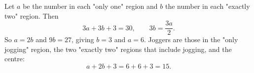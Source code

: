 Let $a$ be the number in each "only one" region and $b$ the number in each "exactly two" region. Then
\[
3a+3b+3=30,\qquad 3b=\dfrac{3a}{2}.
\]
So $a=2b$ and $9b=27$, giving $b=3$ and $a=6$. Joggers are those in the "only jogging" region, the two "exactly two" regions that include jogging, and the centre:
\[
a+2b+3=6+6+3=\boxed{15}.
\]
